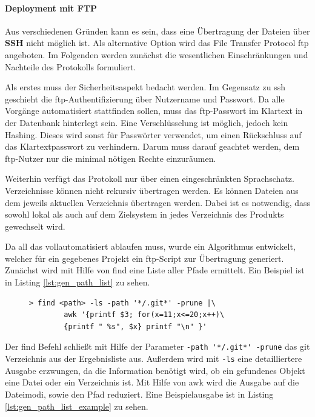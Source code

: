 
\paragraph{Deployment mit FTP} %
\label{par:deployment_mit_ftp}

Aus verschiedenen Gründen kann es sein, dass eine Übertragung der Dateien über \textbf{SSH} nicht möglich ist. Als alternative Option wird das File Transfer Protocol \gls{ftp} angeboten. Im Folgenden werden zunächst die wesentlichen Einschränkungen und Nachteile des Protokolls formuliert.

Als erstes muss der Sicherheitsaspekt bedacht werden. Im Gegensatz zu \gls{ssh} geschieht die \gls{ftp}-Authentifizierung über Nutzername und Passwort. Da alle Vorgänge automatisiert stattfinden sollen, muss das \gls{ftp}-Passwort im Klartext in der Datenbank hinterlegt sein. Eine Verschlüsselung ist möglich, jedoch kein Hashing. Dieses wird sonst für Passwörter verwendet, um einen Rückschluss auf das Klartextpasswort zu verhindern. Darum muss darauf geachtet werden, dem \gls{ftp}-Nutzer nur die minimal nötigen Rechte einzuräumen.

Weiterhin verfügt das Protokoll nur über einen eingeschränkten Sprachschatz. Verzeichnisse können nicht rekursiv übertragen werden. Es können Dateien aus dem jeweils aktuellen Verzeichnis übertragen werden. Dabei ist es notwendig, dass sowohl lokal als auch auf dem Zielsystem in jedes Verzeichnis des Produkts gewechselt wird.

Da all das vollautomatisiert ablaufen muss, wurde ein Algorithmus entwickelt, welcher für ein gegebenes Projekt ein \gls{ftp}-Script zur Übertragung generiert. Zunächst wird mit Hilfe von find eine Liste aller Pfade ermittelt. Ein Beispiel ist in Listing \ref{lst:gen_path_list} zu sehen.

\begin{figure}
	\begin{lstlisting}[caption=Generiere Liste aller Pfade,label={lst:gen_path_list}]
	> find <path> -ls -path '*/.git*' -prune |\
		awk '{printf $3; for(x=11;x<=20;x++)\
		{printf " %s", $x} printf "\n" }'
	\end{lstlisting}
\end{figure}

Der \gls{find} Befehl schließt mit Hilfe der Parameter \lstinline!-path '*/.git*' -prune! das git Verzeichnis aus der Ergebnisliste aus. Außerdem wird mit \lstinline!-ls! eine detailliertere Ausgabe erzwungen, da die Information benötigt wird, ob ein gefundenes Objekt eine Datei oder ein Verzeichnis ist. Mit Hilfe von \gls{awk} wird die Ausgabe auf die Dateimodi, sowie den Pfad reduziert. Eine Beispielausgabe ist in Listing \ref{lst:gen_path_list_example} zu sehen.

